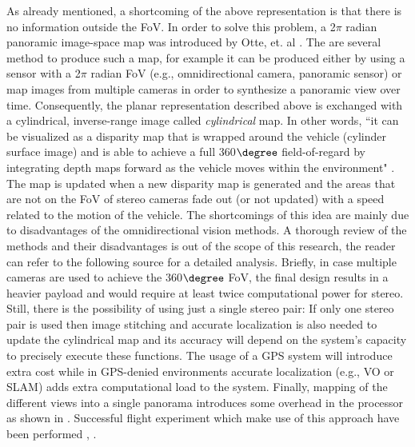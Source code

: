 As already mentioned, a shortcoming of the above representation is that there is no information outside the \acs{FoV}. In order to solve this problem, a 2$\pi$ radian panoramic image-space map was introduced by Otte, et. al \cite{Otte2009}. The are several method to produce such a map, for example it can be produced either by using a sensor with a 2$\pi$ radian \acs{FoV} (e.g., omnidirectional camera, panoramic sensor) or map images from multiple cameras in order to synthesize a panoramic view over time. Consequently, the planar representation described above is exchanged with a cylindrical, inverse-range image called \textit{cylindrical} map. In other words, ``it can be visualized as a disparity map that is wrapped around the vehicle (cylinder surface image) and is able to achieve a full 360$\degree$ field-of-regard by integrating depth maps forward as the vehicle moves within the environment" \cite{Brockers2016b}. The map is updated when a new disparity map is generated and the areas that are not on the \ac{FoV} of stereo cameras fade out (or not updated) with a speed related to the motion of the vehicle. The shortcomings of this idea are mainly due to disadvantages of the omnidirectional vision methods. A thorough review of the methods and their disadvantages is out of the scope of this research, the reader can refer to the following source \cite{omnivision} for a detailed analysis. Briefly, in case multiple cameras are used to achieve the 360$\degree$ \ac{FoV}, the final design results in a heavier payload and would require at least twice computational power for stereo. Still, there is the possibility of using just a single stereo pair: If only one stereo pair is used then image stitching and accurate localization is also needed to update the cylindrical map and its accuracy will depend on the system's capacity to precisely execute these functions. The usage of a GPS system will introduce extra cost while in GPS-denied environments accurate localization (e.g., \ac{VO} or \ac{SLAM}) adds extra computational load to the system. Finally, mapping of the different views into a single panorama introduces some overhead in the processor as shown in \cite{Brockers2016b}. Successful flight experiment which make use of this approach have been performed \cite{Brockers2016b}, \cite{Fragoso2017}.

